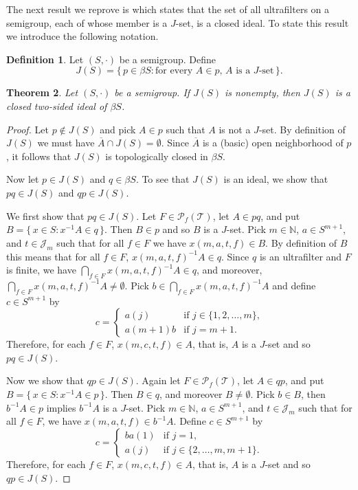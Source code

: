 \documentclass[12pt]{article}
\theoremstyle{plain}
\newtheorem{thm}{Theorem}[section]
\theoremstyle{definition}
\newtheorem{defn}[thm]{Definition}
\newcommand{\bbN}{\mathbb{N}}
\newcommand{\calJ}{\mathcal{J}}
\newcommand{\calT}{\mathcal{T}}
\newcommand{\Pf}{\mathcal{P}_f}
\begin{document}
The next result we reprove is \cite[Theorem 3.4]{De:2008uq} which states that the set of all ultrafilters on a semigroup, each of whose member is a $J$-set, is a closed ideal.
To state this result we introduce the following notation.

\begin{defn}
  Let $(S, \cdot)$ be a semigroup. 
  Define
  \[
    J(S) = \{\, p \in \beta S : \mbox{for every $A \in p$, $A$ is a $J$-set} \,\}.
  \]
\end{defn}

\begin{thm}
  Let $(S, \cdot)$ be a semigroup.
  If $J(S)$ is nonempty, then $J(S)$ is a closed two-sided ideal of $\beta S$.
\end{thm}
\begin{proof}
  Let $p \not\in J(S)$ and pick $A \in p$ such that $A$ is not a $J$-set.
  By definition of $J(S)$ we must have $\overline{A} \cap J(S) = \emptyset$.
  Since $\overline{A}$ is a (basic) open neighborhood of $p$, it follows that $J(S)$ is topologically closed in $\beta S$.

  Now let $p \in J(S)$ and $q \in \beta S$.
  To see that $J(S)$ is an ideal, we show that $pq \in J(S)$ and $qp \in J(S)$. 

  We first show that $pq \in J(S)$.
  Let $F \in \Pf(\calT)$, let $A \in pq$, and put $B = \{\, x \in S : x^{-1}A \in q \,\}$.
  Then $B \in p$ and so $B$ is a $J$-set.
  Pick $m \in \bbN$, $a \in S^{m+1}$, and $t \in \calJ_m$ such that for all $f \in F$ we have $x(m, a, t, f) \in B$.
  By definition of $B$ this means that for all $f \in F$, $x(m, a, t, f)^{-1}A \in q$. 
  Since $q$ is an ultrafilter and $F$ is finite, we have $\bigcap_{f \in F} x(m, a, t, f)^{-1}A \in q$, and moreover, $\bigcap_{f \in F} x(m, a, t, f)^{-1}A \ne \emptyset$.
  Pick $b \in \bigcap_{f \in F} x(m, a, t, f)^{-1}A$ and define $c \in S^{m+1}$ by
  \[
    c =
    \begin{cases}
      a(j) & \mbox{if $j \in \{1, 2, \ldots, m\}$,} \\
      a(m+1)b & \mbox{if $j = m+1$.}
    \end{cases}
  \]
  Therefore, for each $f \in F$, $x(m, c, t, f) \in A$, that is, $A$ is a $J$-set and so $pq \in J(S)$.

  Now we show that $qp \in J(S)$.
  Again let $F \in \Pf(\calT)$, let $A \in qp$, and put $B = \{\, x \in S : x^{-1}A \in p \,\}$.
  Then $B \in q$, and moreover $B \ne \emptyset$.
  Pick $b \in B$, then $b^{-1}A \in p$ implies $b^{-1}A$ is a $J$-set.
  Pick $m \in \bbN$, $a \in S^{m+1}$, and $t \in \calJ_m$ such that for all $f \in F$, we have $x(m, a, t, f) \in b^{-1}A$.
  Define $c \in S^{m+1}$ by
  \[
    c =
    \begin{cases}
      ba(1) & \mbox{if $j =1$,} \\
      a(j) & \mbox{if $j \in \{2, \ldots, m, m+1\}$.}
    \end{cases}
  \]
  Therefore, for each $f \in F$, $x(m, c, t, f) \in A$, that is, $A$ is a $J$-set and so $qp \in J(S)$.
\end{proof}
\end{document}
